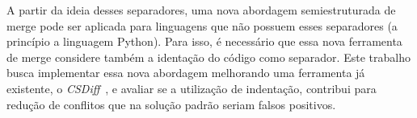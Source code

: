 A partir da ideia desses separadores, uma nova abordagem semiestruturada de
merge pode ser aplicada para linguagens que não possuem esses separadores (a
princípio a linguagem Python). Para isso, é necessário que essa nova ferramenta
de merge considere também a identação do código como separador. Este trabalho
busca implementar essa nova abordagem melhorando uma ferramenta já existente, o
\emph{CSDiff}~\cite{clementino2021textual}, e avaliar se a utilização de
indentação, contribui para redução de conflitos que na solução padrão seriam
falsos positivos.
